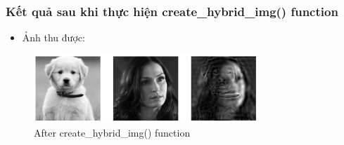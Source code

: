 \documentclass{article}
\begin{document}
\subsubsection{Kết quả sau khi thực hiện create\_hybrid\_img() function}
\begin{itemize}
    \item Ảnh thu được:
\end{itemize}

\begin{figure}[H]
    \centering
    \includegraphics[width=0.75\textwidth]{ex24_output}
    \caption{After create\_hybrid\_img() function}
    \label{ex24_output}
\end{figure}
\end{document}
